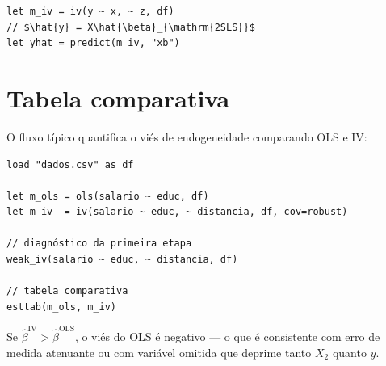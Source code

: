 \begin{lstlisting}
let m_iv = iv(y ~ x, ~ z, df)
// $\hat{y} = X\hat{\beta}_{\mathrm{2SLS}}$
let yhat = predict(m_iv, "xb")
\end{lstlisting}

\section{Tabela comparativa}

O fluxo típico quantifica o viés de endogeneidade comparando OLS e IV:

\begin{lstlisting}[caption={Fluxo completo de análise IV}]
load "dados.csv" as df

let m_ols = ols(salario ~ educ, df)
let m_iv  = iv(salario ~ educ, ~ distancia, df, cov=robust)

// diagnóstico da primeira etapa
weak_iv(salario ~ educ, ~ distancia, df)

// tabela comparativa
esttab(m_ols, m_iv)
\end{lstlisting}

Se $\hat{\beta}^{\mathrm{IV}} > \hat{\beta}^{\mathrm{OLS}}$, o viés do OLS
é negativo — o que é consistente com erro de medida atenuante ou com
variável omitida que deprime tanto $X_2$ quanto $y$.
